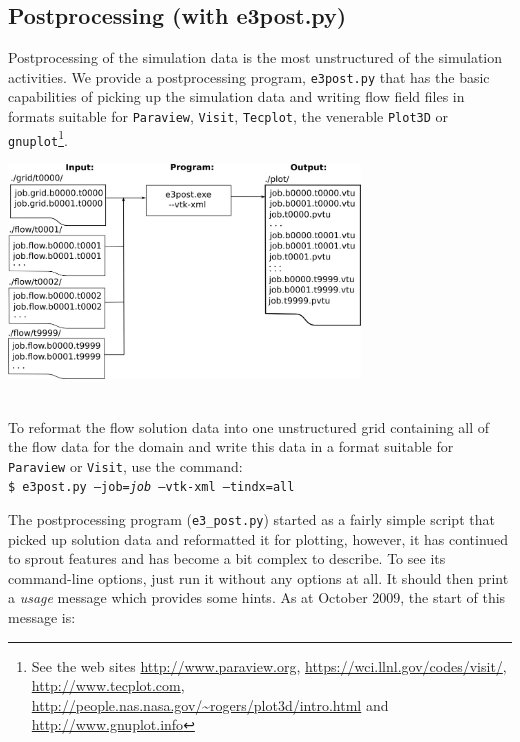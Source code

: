 \subsection{Postprocessing (with e3post.py)} 
\label{sec:e3post}
%
Postprocessing of the simulation data is the most unstructured of the simulation activities.
We provide a postprocessing program, \texttt{e3post.py} that has the basic capabilities of picking up 
the simulation data and writing flow field files in formats suitable for 
\texttt{Paraview}, \texttt{Visit}, \texttt{Tecplot}, the venerable \texttt{Plot3D} or 
\texttt{gnuplot}\footnote{See the web sites  \url{http://www.paraview.org}, \url{https://wci.llnl.gov/codes/visit/},
\url{http://www.tecplot.com}, \url{http://people.nas.nasa.gov/\~rogers/plot3d/intro.html} and \url{http://www.gnuplot.info}}.
\vspace{0.25cm} \\
\centerline{\includegraphics[width=0.7\textwidth]{figs/post-process.png}}\\

\medskip
To reformat the flow solution data into one unstructured grid
containing all of the flow data for the domain and write this data in a format suitable
for \texttt{Paraview} or \texttt{Visit}, use the command:\\
\texttt{\$ e3post.py --job=\textit{job} --vtk-xml --tindx=all}\\ 

\medskip
The postprocessing program (\texttt{e3\_post.py}) started as a fairly simple script that picked up solution data
and reformatted it for plotting, however, it has continued to sprout features and has become a bit 
complex to describe.
To see its command-line options, just run it without any options at all.
It should then print a \textit{usage} message which provides some hints.
As at October 2009, the start of this message is:

